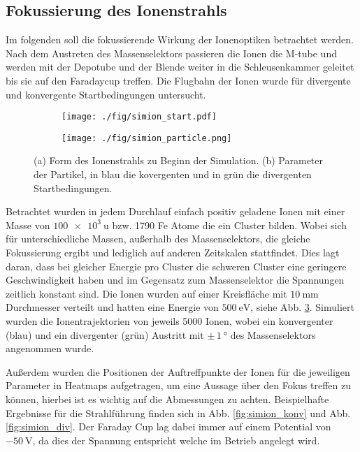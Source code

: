 \subsection{Fokussierung des Ionenstrahls}
\label{sec:fokus1}
Im folgenden soll die fokussierende Wirkung der Ionenoptiken betrachtet werden.
Nach dem Austreten des Massenselektors passieren die Ionen die M-tube und werden mit der Depotube und der Blende weiter in die Schleusenkammer geleitet bis sie auf den Faradaycup treffen.
Die Flugbahn der Ionen wurde für divergente und konvergente Startbedingungen untersucht.
\begin{figure}
  \centering
  \begin{subfigure}[h]{0.5\textwidth}
    \texttt{[image: ./fig/simion\_start.pdf]}
    \caption{}
    \label{fig:strahlform}
  \end{subfigure}\hfill
  \begin{subfigure}[h]{0.475\textwidth}
    \texttt{[image: ./fig/simion\_particle.png]}
    \caption{}
    \label{fig:strahlparameter}
  \end{subfigure}
  \caption{(a) Form des Ionenstrahls zu Beginn der Simulation. (b) Parameter der Partikel, in blau die kovergenten und in grün die divergenten Startbedingungen.}
  \label{fig:simion_start}
\end{figure}
Betrachtet wurden in jedem Durchlauf einfach positiv geladene Ionen mit einer Masse von $\SI{100e3}{\amu}$ bzw. 1790 Fe Atome die ein Cluster bilden.
Wobei sich für unterschiedliche Massen, außerhalb des Massenselektors, die gleiche Fokussierung ergibt
und lediglich auf anderen Zeitskalen stattfindet.
Dies lagt daran, dass bei gleicher Energie pro Cluster die schweren Cluster eine geringere Geschwindigkeit haben und im Gegensatz zum Massenselektor die Spannungen zeitlich konstant sind.
Die Ionen wurden auf einer Kreisfläche mit $\SI{10}{\mm}$ Durchmesser verteilt und hatten eine Energie von $\SI{500}{\eV}$, siehe Abb. \ref{fig:simion_start}.
Simuliert wurden die Ionentrajektorien von jeweils 5000 Ionen, wobei ein konvergenter (blau) und ein divergenter (grün) Austritt mit $\pm\,\SI{1}{\degree}$ des Massenselektors angenommen wurde.




Außerdem wurden die Positionen der Auftreffpunkte der Ionen für die jeweiligen Parameter in Heatmaps aufgetragen, um eine Aussage über den Fokus treffen zu können, hierbei ist es wichtig auf die Abmessungen zu achten.
Beispielhafte Ergebnisse für die Strahlführung finden sich in Abb. \ref{fig:simion_konv} und Abb. \ref{fig:simion_div}.
Der Faraday Cup lag dabei immer auf einem Potential von $\SI{-50}{\volt}$, da dies der Spannung entspricht welche im Betrieb angelegt wird.\\

